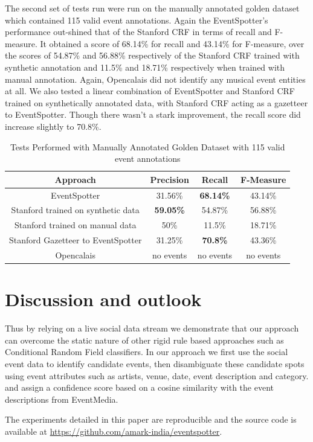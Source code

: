 \documentclass[10pt,a4paper]{article}
\begin{document}
The second set of tests run were run on the manually annotated golden dataset which contained 115 valid event annotations. Again the EventSpotter's performance out-shined that of the Stanford CRF in terms of recall and F-measure. It obtained a score of 68.14\% for recall and 43.14\% for F-measure, over the scores of 54.87\% and 56.88\% respectively of the Stanford CRF trained with synthetic annotation and 11.5\% and 18.71\% respectively when trained with manual annotation. Again, Opencalais did not identify any musical event entities at all. We also tested a linear combination of EventSpotter and Stanford CRF trained on synthetically annotated data, with Stanford CRF acting as a gazetteer to EventSpotter. Though there wasn't a stark improvement, the recall score did increase slightly to 70.8\%.
\begin{table}
\centering %
\begin{tabular}{c c c c} %
\hline\hline %
Approach & Precision & Recall & F-Measure \\ [0.5ex] %
\hline %
EventSpotter & 31.56\% & \bf 68.14\% \bf & 43.14\% \\
Stanford trained on synthetic data & \bf 59.05\% \bf & 54.87\% & 56.88\%\\
Stanford trained on manual data & 50\% & 11.5\% & 18.71\% \\
Stanford Gazetteer to EventSpotter & 31.25\% & \bf 70.8\% \bf & 43.36\% \\
Opencalais & no events & no events & no events \\
\hline %
\end{tabular}
\caption{Tests Performed with Manually Annotated Golden Dataset with 115 valid event annotations} %
\label{table:nonlin} %
\end{table}

\section{Discussion and outlook}
Thus by relying on a live social data stream we demonstrate that our approach can overcome the static nature of other rigid rule based approaches such as Conditional Random Field classifiers. In our approach we first use the social event data to identify candidate events, then disambiguate these candidate spots using event attributes such as artists, venue, date, event description and category. and assign a confidence score based on a cosine similarity with the event descriptions from EventMedia. 

{\color{red}{G:Outlook.}}

The experiments detailed in this paper are reproducible and the source code is available at \url{https://github.com/amark-india/eventspotter}. 




\end{document}
